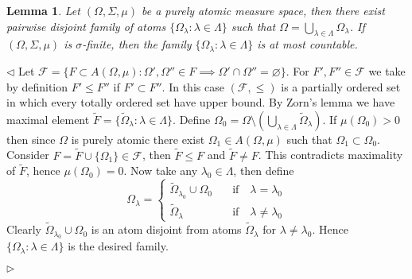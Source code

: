 \documentclass[12pt]{article}
\newtheorem{lemma}[theorem]{Lemma}
\newenvironment{proof}{\par $\triangleleft$}{$\triangleright$}
\begin{document}
\begin{lemma}\label{PureAtomSpDecomp} Let $(\Omega,\Sigma,\mu)$ be a purely
    atomic measure space, then there exist pairwise disjoint family of atoms $
        \{\Omega_\lambda:\lambda\in\Lambda \}$ such that
    $\Omega=\bigcup_{\lambda\in\Lambda}\Omega_\lambda$. If $(\Omega,\Sigma,\mu)$
    is $\sigma$-finite, then the family $ \{\Omega_\lambda:\lambda\in\Lambda \}$
    is at most countable.
\end{lemma}
\begin{proof}
    Let
    $\mathcal{F}= \{F\subset A(\Omega,\mu):
        \Omega',\Omega''\in F\implies \Omega'\cap\Omega''=\varnothing \}$.
    For $F',F''\in\mathcal{F}$ we take by
    definition $F'\leq F''$ if $F'\subset F''$. In this case
    $(\mathcal{F},\leq)$ is a partially ordered set in which every totally
    ordered set have upper bound. By Zorn's lemma we have maximal element
    $\widetilde{F}= \{\widetilde{\Omega}_\lambda:\lambda\in\Lambda \}$. Define
    $\Omega_0
        =\Omega\setminus(\bigcup_{\lambda\in\Lambda}\widetilde{\Omega}_\lambda)$.
    If $\mu(\Omega_0)>0$ then since $\Omega$ is purely atomic there exist
    $\Omega_1\in A(\Omega,\mu)$ such that $\Omega_1\subset\Omega_0$. Consider
    $F=\widetilde{F}\cup  \{\Omega_1 \}\in\mathcal{F}$, then $\widetilde{F}\leq
        F$ and $\widetilde{F}\neq F$. This contradicts maximality of
    $\widetilde{F}$, hence $\mu(\Omega_0)=0$. Now take any
    $\lambda_0\in\Lambda$, then define
    $$
        \Omega_\lambda=
        \begin{cases}
            \widetilde{\Omega}_{\lambda_0}\cup\Omega_0\quad &
            \text{if}\quad\lambda=\lambda_0                   \\
            \widetilde{\Omega}_\lambda            \quad     &
            \text{if}\quad\lambda\neq\lambda_0
        \end{cases}
    $$
    Clearly $\widetilde{\Omega}_{\lambda_0}\cup\Omega_0$ is an atom disjoint
    from atoms $\widetilde{\Omega}_\lambda$ for $\lambda\neq\lambda_0$. Hence $
        \{\Omega_\lambda:\lambda\in\Lambda \}$ is the desired family.


\end{proof}
\end{document}
